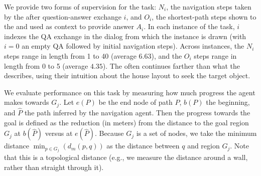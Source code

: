 We provide two forms of supervision for the \task{} task: $N_i$, the navigation steps taken by the \nav{} after question-answer exchange $i$, and $O_i$, the shortest-path steps shown to the \ora{} and used as context to provide answer $A_i$.
In each instance of the task, $i$ indexes the QA exchange in the dialog from which the instance is drawn (with $i=0$ an empty QA followed by initial navigation steps).
Across \task{} instances, the $N_i$ steps range in length from 1 to 40 (average $6.63$), and the $O_i$ steps range in length from 0 to 5 (average $4.35$).
The \nav{} often continues farther than what the \ora{} describes, using their intuition about the house layout to seek the target object.

We evaluate performance on this task by measuring how much progress the agent makes towards $G_j$.
Let $e(P)$ be the end node of path $P$, $b(P)$ the beginning, and $\hat{P}$ the path inferred by the navigation agent.
Then the progress towards the goal is defined as the reduction (in meters) from the distance to the goal region $G_j$ at $b(\hat{P})$ versus at $e(\hat{P})$.
Because $G_j$ is a set of nodes, we take the minimum distance $\min_{p\in G_j}(d_m(p, q))$ as the distance between $q$ and region $G_j$.
Note that this is a topological distance (e.g., we measure the distance around a wall, rather than straight through it).
